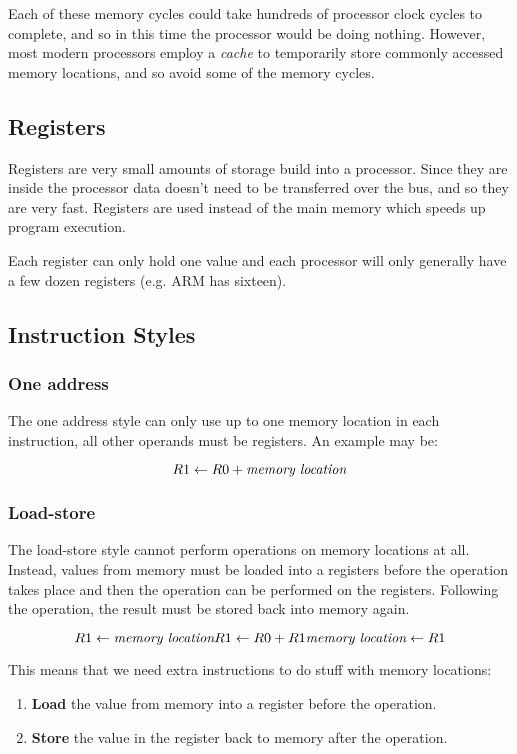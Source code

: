 \documentclass{article} %
\begin{document}
Each of these memory cycles could take hundreds of processor clock cycles to complete, and so in this time the processor would be doing nothing. However, most modern processors employ a {\it cache} to temporarily store commonly accessed memory locations, and so avoid some of the memory cycles. 

\subsection{Registers}
Registers are very small amounts of storage build into a processor. Since they are inside the processor data doesn't need to be transferred over the bus, and so they are very fast. Registers are used instead of the main memory which speeds up program execution.

Each register can only hold one value and each processor will only generally have a few dozen registers (e.g. ARM has sixteen).

\subsection{Instruction Styles}

\subsubsection{One address}
The one address style can only use up to one memory location in each instruction, all other operands must be registers. An example may be:

\[
    R1 \leftarrow R0 + \textrm{\it memory location}
\]

\subsubsection{Load-store}
The load-store style cannot perform operations on memory locations at all. Instead, values from memory must be loaded into a registers before the operation takes place and then the operation can be performed on the registers. Following the operation, the result must be stored back into memory again.

\[
    R1 \leftarrow \textrm{\it memory location}\\
	R1 \leftarrow R0 + R1\\
    \textrm{\it memory location} \leftarrow R1
\]

This means that we need extra instructions to do stuff with memory locations:
\begin{enumerate}
	\item \textbf{Load} the value from memory into a register before the operation.
	\item \textbf{Store} the value in the register back to memory after the operation.
\end{enumerate}
\end{document}
